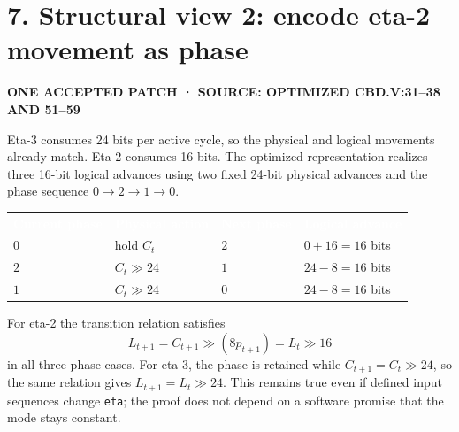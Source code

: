 \documentclass[10pt,a4paper]{article}
\newcommand{\smallcaps}[1]{\textcolor{Mid}{\fontsize{8.5}{10}\selectfont\bfseries\MakeUppercase{#1}}}
\newcommand{\newpageheading}[2]{\clearpage\section{#1}\smallcaps{#2}\vspace{6pt}}
\newcommand{\thead}[1]{\textcolor{white}{\textbf{#1}}}
\begin{document}
\newpageheading{7. Structural view 2: encode eta-2 movement as phase}{One accepted patch · source: optimized cbd.v:31--38 and 51--59}

Eta-3 consumes 24 bits per active cycle, so the physical and logical movements already match. Eta-2 consumes 16 bits. The optimized representation realizes three 16-bit logical advances using two fixed 24-bit physical advances and the phase sequence $0\rightarrow2\rightarrow1\rightarrow0$.

\begin{center}
{\small
{}
\begin{tabularx}{.88\textwidth}{@{}P{27mm}P{34mm}P{37mm}Y@{}}
\thead{Current phase} & \thead{Physical action} & \thead{Next phase} & \thead{Logical advance} \\
$0$ & hold $C_t$ & $2$ & $0+16=16$ bits \\
$2$ & $C_t\gg24$ & $1$ & $24-8=16$ bits \\
$1$ & $C_t\gg24$ & $0$ & $24-8=16$ bits \\
\end{tabularx}
}
\end{center}

For eta-2 the transition relation satisfies
\[
L_{t+1}=C_{t+1}\gg(8p_{t+1})=L_t\gg16
\]
in all three phase cases. For eta-3, the phase is retained while $C_{t+1}=C_t\gg24$, so the same relation gives $L_{t+1}=L_t\gg24$. This remains true even if defined input sequences change \texttt{eta}; the proof does not depend on a software promise that the mode stays constant.

\begin{center}
\end{center}
\end{document}
